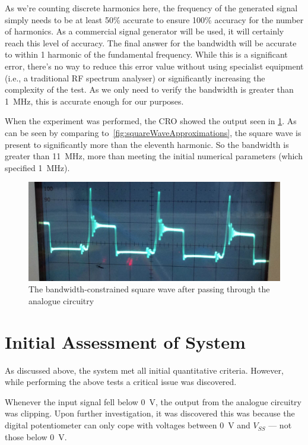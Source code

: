 As we're counting discrete harmonics here, the frequency of the generated signal
simply needs to be at least 50\% accurate to ensure 100\% accuracy for the
number of harmonics. As a commercial signal generator will be used, it will
certainly reach this level of accuracy. The final answer for the bandwidth will
be accurate to within 1 harmonic of the fundamental frequency. While this is a
significant error, there's no way to reduce this error value without using
specialist equipment (i.e., a traditional RF spectrum analyser) or significantly
increasing the complexity of the test. As we only need to verify the bandwidth
is greater than \SI{1}{\MHz}, this is accurate enough for our purposes.

When the experiment was performed, the CRO showed the output seen in
\cref{fig:scopeBandwidthPhoto}. As
can be seen by comparing to~\cref{fig:squareWaveApproximations}, the square wave
is present to significantly more than the eleventh harmonic. So the bandwidth is
greater than \SI{11}{\MHz}, more than meeting the initial numerical parameters
(which specified \SI{1}{\MHz}).

\begin{figure}[h]
  \includegraphics[width=\linewidth]{img/bw.jpg}
  \caption{The bandwidth-constrained square wave after passing through the analogue circuitry}
  \label{fig:scopeBandwidthPhoto}
\end{figure}

\section{Initial Assessment of System}

As discussed above, the system met all initial quantitative criteria. However,
while performing the above tests a critical issue was discovered.

Whenever the input signal fell below \SI{0}{\V}, the output from the analogue
circuitry was clipping.  Upon further investigation, it was discovered this was
because the digital potentiometer can only cope with voltages between \SI{0}{\V}
and $V_{SS}$ --- not those below \SI{0}{\V}.

